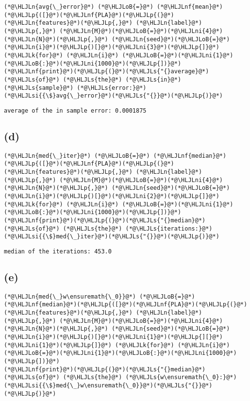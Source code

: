 \documentclass[12pt,a4paper]{article}
\newcommand{\HLJLk}[1]{\textcolor[RGB]{148,91,176}{\textbf{#1}}}
\newcommand{\HLJLn}[1]{#1}
\newcommand{\HLJLnf}[1]{\textcolor[RGB]{66,102,213}{#1}}
\newcommand{\HLJLs}[1]{\textcolor[RGB]{201,61,57}{#1}}
\newcommand{\HLJLsi}[1]{#1}
\newcommand{\HLJLni}[1]{\textcolor[RGB]{59,151,46}{#1}}
\newcommand{\HLJLoB}[1]{\textcolor[RGB]{102,102,102}{\textbf{#1}}}
\newcommand{\HLJLp}[1]{#1}
\begin{document}
\begin{lstlisting}
(*@\HLJLn{avg{\_}error}@*) (*@\HLJLoB{=}@*) (*@\HLJLnf{mean}@*)(*@\HLJLp{([}@*)(*@\HLJLnf{PLA}@*)(*@\HLJLp{(}@*)(*@\HLJLn{features}@*)(*@\HLJLp{,}@*) (*@\HLJLn{label}@*)(*@\HLJLp{,}@*) (*@\HLJLn{M}@*)(*@\HLJLoB{=}@*)(*@\HLJLni{4}@*)(*@\HLJLn{N}@*)(*@\HLJLp{,}@*) (*@\HLJLn{seed}@*)(*@\HLJLoB{=}@*)(*@\HLJLn{i}@*)(*@\HLJLp{)[}@*)(*@\HLJLni{3}@*)(*@\HLJLp{]}@*) (*@\HLJLk{for}@*) (*@\HLJLn{i}@*) (*@\HLJLoB{=}@*)(*@\HLJLni{1}@*)(*@\HLJLoB{:}@*)(*@\HLJLni{1000}@*)(*@\HLJLp{])}@*)
(*@\HLJLnf{print}@*)(*@\HLJLp{(}@*)(*@\HLJLs{"{}average}@*) (*@\HLJLs{of}@*) (*@\HLJLs{the}@*) (*@\HLJLs{in}@*) (*@\HLJLs{sample}@*) (*@\HLJLs{error:}@*) (*@\HLJLsi{{\$}avg{\_}error}@*)(*@\HLJLs{"{}}@*)(*@\HLJLp{)}@*)
\end{lstlisting}

\begin{lstlisting}
average of the in sample error: 0.0001875
\end{lstlisting}


\subsection{(d)}

\begin{lstlisting}
(*@\HLJLn{med{\_}iter}@*) (*@\HLJLoB{=}@*) (*@\HLJLnf{median}@*)(*@\HLJLp{([}@*)(*@\HLJLnf{PLA}@*)(*@\HLJLp{(}@*)(*@\HLJLn{features}@*)(*@\HLJLp{,}@*) (*@\HLJLn{label}@*)(*@\HLJLp{,}@*) (*@\HLJLn{M}@*)(*@\HLJLoB{=}@*)(*@\HLJLni{4}@*)(*@\HLJLn{N}@*)(*@\HLJLp{,}@*) (*@\HLJLn{seed}@*)(*@\HLJLoB{=}@*)(*@\HLJLn{i}@*)(*@\HLJLp{)[}@*)(*@\HLJLni{2}@*)(*@\HLJLp{]}@*) (*@\HLJLk{for}@*) (*@\HLJLn{i}@*) (*@\HLJLoB{=}@*)(*@\HLJLni{1}@*)(*@\HLJLoB{:}@*)(*@\HLJLni{1000}@*)(*@\HLJLp{])}@*)
(*@\HLJLnf{print}@*)(*@\HLJLp{(}@*)(*@\HLJLs{"{}median}@*) (*@\HLJLs{of}@*) (*@\HLJLs{the}@*) (*@\HLJLs{iterations:}@*) (*@\HLJLsi{{\$}med{\_}iter}@*)(*@\HLJLs{"{}}@*)(*@\HLJLp{)}@*)
\end{lstlisting}

\begin{lstlisting}
median of the iterations: 453.0
\end{lstlisting}


\subsection{(e)}

\begin{lstlisting}
(*@\HLJLn{med{\_}w\ensuremath{\_0}}@*) (*@\HLJLoB{=}@*) (*@\HLJLnf{median}@*)(*@\HLJLp{([}@*)(*@\HLJLnf{PLA}@*)(*@\HLJLp{(}@*)(*@\HLJLn{features}@*)(*@\HLJLp{,}@*) (*@\HLJLn{label}@*)(*@\HLJLp{,}@*) (*@\HLJLn{M}@*)(*@\HLJLoB{=}@*)(*@\HLJLni{4}@*)(*@\HLJLn{N}@*)(*@\HLJLp{,}@*) (*@\HLJLn{seed}@*)(*@\HLJLoB{=}@*)(*@\HLJLn{i}@*)(*@\HLJLp{)[}@*)(*@\HLJLni{1}@*)(*@\HLJLp{][}@*)(*@\HLJLni{1}@*)(*@\HLJLp{]}@*) (*@\HLJLk{for}@*) (*@\HLJLn{i}@*) (*@\HLJLoB{=}@*)(*@\HLJLni{1}@*)(*@\HLJLoB{:}@*)(*@\HLJLni{1000}@*)(*@\HLJLp{])}@*)
(*@\HLJLnf{print}@*)(*@\HLJLp{(}@*)(*@\HLJLs{"{}median}@*) (*@\HLJLs{of}@*) (*@\HLJLs{the}@*) (*@\HLJLs{w\ensuremath{\_0}:}@*) (*@\HLJLsi{{\$}med{\_}w\ensuremath{\_0}}@*)(*@\HLJLs{"{}}@*)(*@\HLJLp{)}@*)
\end{lstlisting}
\end{document}
